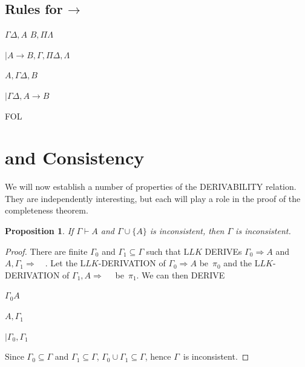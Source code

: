 \documentclass[10pt,a4paper]{article}
\newcommand*{\olup}[1]{\MakeUppercase{#1}}
\theoremstyle{plain}
\newtheorem{prop}[thm]{Proposition}
\theoremstyle{definition}
\theoremstyle{remark}
\newcommand*{\olfileid}[3]{}
\newcommand*{\olsection}[1]{\section*{#1}}
\newcommand*{\ollabel}[1]{\label{#1}}
\providecommand{\AxiomC}[1]{}
\providecommand{\RightLabel}[1]{}
\providecommand{\DisplayProof}{}
\providecommand{\fCenter}{}
\newenvironment{prooftree}{}{}
\providecommand{\lif}{\mathbin{\rightarrow}}
\providecommand{\Sequent}{\mathrel{\Rightarrow}}
\providecommand{\Proves}{\mathrel{\vdash}}
\providecommand{\Log}{\ensuremath{\mathrm{L}}}
\providecommand{\iftag}[1]{#1}
\providecommand{\LeftR}[1]{}
\providecommand{\RightR}[1]{}
\providecommand{\Deduce}{\mathrm{D}}
\providecommand{\UnaryInf}{\ensuremath{\mid}}
\providecommand{\BinaryInf}{\ensuremath{\mid}}
\providecommand{\Cut}{\mathrm{Cut}}
\providecommand{\RightR}{\mathrm{R}}
\providecommand{\LeftR}{\mathrm{L}}
\providecommand{\Axiom}{\mathrm{Ax}}
\providecommand{\iftag}{}
\begin{document}
\subsection{Rules for $\lif$}

\begin{defish}
\Axiom$ \Gamma \fCenter \Delta, A$
\Axiom$ B, \Pi \fCenter \Lambda$
\RightLabel{\LeftR{\lif}}
\BinaryInf$ A \lif B, \Gamma, \Pi \fCenter \Delta, \Lambda$
\DisplayProof
\hfill
\Axiom$ A, \Gamma \fCenter \Delta, B$
\RightLabel{\RightR{\lif}}
\UnaryInf$ \Gamma \fCenter \Delta, A \lif B $
\DisplayProof
\end{defish}





\iftag{FOL}
      {\olfileid{fol}{seq}{prv}}
      {\olfileid{pl}{seq}{prv}}

\olsection{ and Consistency}

We will now establish a number of properties of the \olup{derivability}
relation.  They are independently interesting, but each will play a
role in the proof of the completeness theorem.

\begin{prop}\ollabel{prop:provability-contr}
  If $\Gamma \Proves A$ and $\Gamma \cup \{A\}$ is
  inconsistent, then $\Gamma$ is inconsistent.
\end{prop}

\begin{proof}
There are finite $\Gamma_0$ and $\Gamma_1 \subseteq \Gamma$ such that
$\Log{LK}$ \olup{derive}s $\Gamma_0 \Sequent A$ and $A, \Gamma_1
\Sequent \quad$.  Let the $\Log{LK}$-\olup{derivation} of $\Gamma_0 \Sequent
A$ be~$\pi_0$ and the $\Log{LK}$-\olup{derivation} of $\Gamma_1, A
\Sequent \quad$ be~$\pi_1$. We can then \olup{derive}
\begin{prooftree}
\AxiomC{}
\RightLabel{$\pi_0$}
\Deduce$ \Gamma_0 \fCenter A $
\AxiomC{}
\RightLabel{$\pi_1$}
\Deduce$A, \Gamma_1 \fCenter $
\RightLabel{\Cut}
\BinaryInf$ \Gamma_0,\Gamma_1 \fCenter $
\end{prooftree}

Since $\Gamma_0 \subseteq \Gamma$ and $\Gamma_1 \subseteq \Gamma$,
$\Gamma_0 \cup \Gamma_1 \subseteq \Gamma$, hence $\Gamma$~is inconsistent.
\end{proof}
\end{document}
